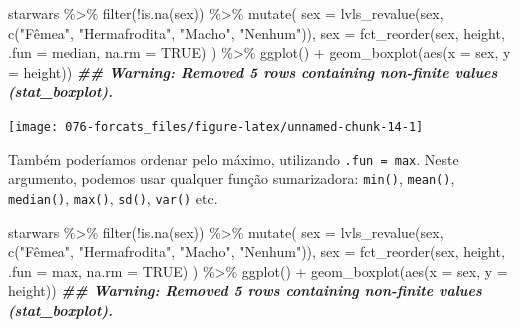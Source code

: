 \documentclass[
]{book}
\newenvironment{Shaded}{\begin{snugshade}}{\end{snugshade}}
\newcommand{\AttributeTok}[1]{\textcolor[rgb]{0.77,0.63,0.00}{#1}}
\newcommand{\ConstantTok}[1]{\textcolor[rgb]{0.00,0.00,0.00}{#1}}
\newcommand{\DocumentationTok}[1]{\textcolor[rgb]{0.56,0.35,0.01}{\textbf{\textit{#1}}}}
\newcommand{\FunctionTok}[1]{\textcolor[rgb]{0.00,0.00,0.00}{#1}}
\newcommand{\NormalTok}[1]{#1}
\newcommand{\SpecialCharTok}[1]{\textcolor[rgb]{0.00,0.00,0.00}{#1}}
\newcommand{\StringTok}[1]{\textcolor[rgb]{0.31,0.60,0.02}{#1}}
\begin{document}
\begin{Shaded}
\begin{Highlighting}[]
\NormalTok{starwars }\SpecialCharTok{\%\textgreater{}\%} 
  \FunctionTok{filter}\NormalTok{(}\SpecialCharTok{!}\FunctionTok{is.na}\NormalTok{(sex)) }\SpecialCharTok{\%\textgreater{}\%} 
  \FunctionTok{mutate}\NormalTok{(}
    \AttributeTok{sex =} \FunctionTok{lvls\_revalue}\NormalTok{(sex, }\FunctionTok{c}\NormalTok{(}\StringTok{"Fêmea"}\NormalTok{, }\StringTok{"Hermafrodita"}\NormalTok{, }\StringTok{"Macho"}\NormalTok{, }\StringTok{"Nenhum"}\NormalTok{)),}
    \AttributeTok{sex =} \FunctionTok{fct\_reorder}\NormalTok{(sex, height, }\AttributeTok{.fun =}\NormalTok{ median, }\AttributeTok{na.rm =} \ConstantTok{TRUE}\NormalTok{)}
\NormalTok{  ) }\SpecialCharTok{\%\textgreater{}\%} 
\FunctionTok{ggplot}\NormalTok{() }\SpecialCharTok{+}
  \FunctionTok{geom\_boxplot}\NormalTok{(}\FunctionTok{aes}\NormalTok{(}\AttributeTok{x =}\NormalTok{ sex, }\AttributeTok{y =}\NormalTok{ height))}
\DocumentationTok{\#\# Warning: Removed 5 rows containing non{-}finite values (stat\_boxplot).}
\end{Highlighting}
\end{Shaded}

\begin{center}\texttt{[image: 076-forcats\_files/figure-latex/unnamed-chunk-14-1]} \end{center}

Também poderíamos ordenar pelo máximo, utilizando \texttt{.fun\ =\ max}. Neste argumento, podemos usar qualquer função sumarizadora: \texttt{min()}, \texttt{mean()}, \texttt{median()}, \texttt{max()}, \texttt{sd()}, \texttt{var()} etc.

\begin{Shaded}
\begin{Highlighting}[]
\NormalTok{starwars }\SpecialCharTok{\%\textgreater{}\%} 
  \FunctionTok{filter}\NormalTok{(}\SpecialCharTok{!}\FunctionTok{is.na}\NormalTok{(sex)) }\SpecialCharTok{\%\textgreater{}\%} 
  \FunctionTok{mutate}\NormalTok{(}
    \AttributeTok{sex =} \FunctionTok{lvls\_revalue}\NormalTok{(sex, }\FunctionTok{c}\NormalTok{(}\StringTok{"Fêmea"}\NormalTok{, }\StringTok{"Hermafrodita"}\NormalTok{, }\StringTok{"Macho"}\NormalTok{, }\StringTok{"Nenhum"}\NormalTok{)),}
    \AttributeTok{sex =} \FunctionTok{fct\_reorder}\NormalTok{(sex, height, }\AttributeTok{.fun =}\NormalTok{ max, }\AttributeTok{na.rm =} \ConstantTok{TRUE}\NormalTok{)}
\NormalTok{  ) }\SpecialCharTok{\%\textgreater{}\%} 
\FunctionTok{ggplot}\NormalTok{() }\SpecialCharTok{+}
  \FunctionTok{geom\_boxplot}\NormalTok{(}\FunctionTok{aes}\NormalTok{(}\AttributeTok{x =}\NormalTok{ sex, }\AttributeTok{y =}\NormalTok{ height))}
\DocumentationTok{\#\# Warning: Removed 5 rows containing non{-}finite values (stat\_boxplot).}
\end{Highlighting}
\end{Shaded}
\end{document}

